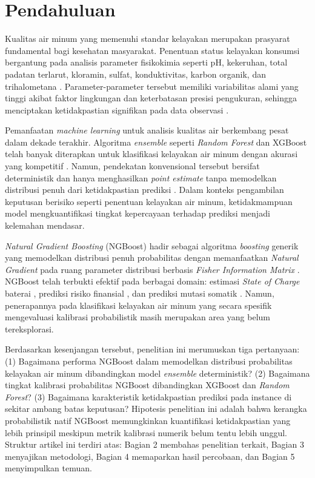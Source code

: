 \documentclass[metlit,article,accept,pdftex,moreauthors]{Definitions/mdpi}
\begin{document}
\section{Pendahuluan}

Kualitas air minum yang memenuhi standar kelayakan merupakan prasyarat fundamental bagi kesehatan masyarakat. Penentuan status kelayakan konsumsi bergantung pada analisis parameter fisikokimia seperti pH, kekeruhan, total padatan terlarut, kloramin, sulfat, konduktivitas, karbon organik, dan trihalometana \cite{aslam2022water, park2022ensemble, ahmed2022water}. Parameter-parameter tersebut memiliki variabilitas alami yang tinggi akibat faktor lingkungan dan keterbatasan presisi pengukuran, sehingga menciptakan ketidakpastian signifikan pada data observasi \cite{albataineh2026hybrid}.

Pemanfaatan \textit{machine learning} untuk analisis kualitas air berkembang pesat dalam dekade terakhir. Algoritma \textit{ensemble} seperti \textit{Random Forest} dan XGBoost telah banyak diterapkan untuk klasifikasi kelayakan air minum dengan akurasi yang kompetitif \cite{aslam2022water, park2022ensemble, albataineh2026hybrid}. Namun, pendekatan konvensional tersebut bersifat deterministik dan hanya menghasilkan \textit{point estimate} tanpa memodelkan distribusi penuh dari ketidakpastian prediksi \cite{duan2020ngboost}. Dalam konteks pengambilan keputusan berisiko seperti penentuan kelayakan air minum, ketidakmampuan model mengkuantifikasi tingkat kepercayaan terhadap prediksi menjadi kelemahan mendasar.

\textit{Natural Gradient Boosting} (NGBoost) hadir sebagai algoritma \textit{boosting} generik yang memodelkan distribusi penuh probabilitas dengan memanfaatkan \textit{Natural Gradient} pada ruang parameter distribusi berbasis \textit{Fisher Information Matrix} \cite{duan2020ngboost}. NGBoost telah terbukti efektif pada berbagai domain: estimasi \textit{State of Charge} baterai \cite{li2024battery}, prediksi risiko finansial \cite{zhu2023hybrid}, dan prediksi mutasi somatik \cite{marzo2021ngboost}. Namun, penerapannya pada klasifikasi kelayakan air minum yang secara spesifik mengevaluasi kalibrasi probabilistik masih merupakan area yang belum tereksplorasi.

Berdasarkan kesenjangan tersebut, penelitian ini merumuskan tiga pertanyaan: (1) Bagaimana performa NGBoost dalam memodelkan distribusi probabilitas kelayakan air minum dibandingkan model \textit{ensemble} deterministik? (2) Bagaimana tingkat kalibrasi probabilitas NGBoost dibandingkan XGBoost dan \textit{Random Forest}? (3) Bagaimana karakteristik ketidakpastian prediksi pada instance di sekitar ambang batas keputusan? Hipotesis penelitian ini adalah bahwa kerangka probabilistik natif NGBoost memungkinkan kuantifikasi ketidakpastian yang lebih prinsipil meskipun metrik kalibrasi numerik belum tentu lebih unggul. Struktur artikel ini terdiri atas: Bagian 2 membahas penelitian terkait, Bagian 3 menyajikan metodologi, Bagian 4 memaparkan hasil percobaan, dan Bagian 5 menyimpulkan temuan.
\end{document}
